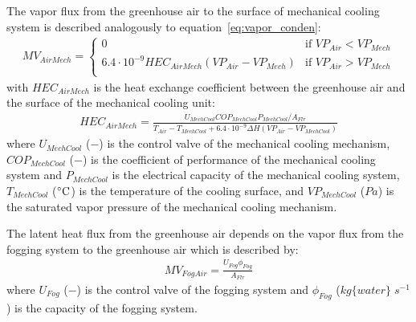 \documentclass[a4paper]{article}
\begin{document}
The vapor flux from the greenhouse air to the surface of mechanical cooling system is described analogously to equation~\eqref{eq:vapor_conden}:
\begin{align}
  MV_{AirMech} = \begin{cases}
    0                                                     & \text{if~} VP_{Air} < VP_{Mech} \\
    6.4 \cdot 10^{-9} HEC_{AirMech}(VP_{Air} - VP_{Mech}) & \text{if~} VP_{Air} > VP_{Mech} \\
  \end{cases}
\end{align}
with \(HEC_{AirMech}\) is the heat exchange coefficient between the greenhouse air and the surface of the mechanical cooling unit:
\begin{align}
  HEC_{AirMech} = \frac{U_{MechCool} COP_{MechCool} P_{MechCool} / A_{Flr}}{T_{Air} - T_{MechCool} + 6.4 \cdot 10^{-9} \Delta H(VP_{Air} - VP_{MechCool})}
\end{align}
where \(U_{MechCool}\) (\(-\)) is the control valve of the mechanical cooling mechanism, \(COP_{MechCool}\) (\(-\)) is the coefficient of performance of the mechanical cooling system and \(P_{MechCool}\) is the electrical capacity of the mechanical cooling system, \(T_{MechCool}\) (\(\celsius\)) is the temperature of the cooling surface, and \(VP_{MechCool}\) (\(Pa\)) is the saturated vapor pressure of the mechanical cooling mechanism.

The latent heat flux from the greenhouse air depends on the vapor flux from the fogging system to the greenhouse air which is described by:
\begin{align}
  MV_{FogAir} = \frac{U_{Fog} \phi_{Fog}}{A_{Flr}}
\end{align}
where \(U_{Fog}\) (\(-\)) is the control valve of the fogging system and \(\phi_{Fog}\) (\(kg\{water\}\;s^{-1}\)) is the capacity of the fogging system.
\end{document}
